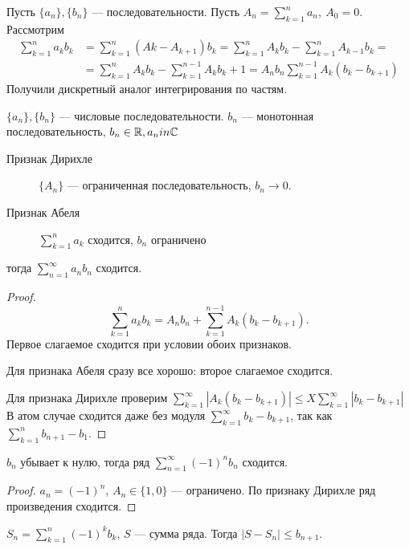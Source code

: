 \begin{lm}
    Пусть $ \{a_n\}, \{b_n\}$ --- последовательности. Пусть $A_n = \sum_{k=1}^{n} a_n , ~ A_0 = 0$.
    Рассмотрим
    \begin{align*}
	\sum_{k=1}^{n}  a_k b_k &= \sum_{k=1}^{n} (Ak - A_{k+1}) b_k = \sum_{k=1}^{n} A_kb_k - \sum_{k=1}^{n} A_{k-1}b_k = \\
				&= \sum_{k=1}^{n} A_k b_k - \sum_{k=1}^{n-1} A_k b_k+1 = A_n b_n  \sum_{k=1}^{n-1} A_k(b_k-b_{k+1})
    \end{align*}
    Получили дискретный аналог интегрирования по частям.
\end{lm}
\begin{thm}
    $ \{a_n\}, \{b_n\}$ --- числовые последовательности.  $ b_n$ --- монотонная последовательность, $ b_n \in \mathbb{R}, a_n in \mathbb{C}$

\begin{description}
    \item[Признак Дирихле] $ \{A_n\} $ --- ограниченная последовательность, $ b_n \to  0$.
    \item[Признак Абеля] $ \sum_{k=1}^{n} a_k $ сходится, $ b_n $ ограничено
\end{description}
тогда $ \sum_{n=1}^{\infty} a_nb_n$ сходится.
\end{thm}
\begin{proof}
     \[
	 \sum_{k=1}^{n} a_k b_k = A_n b_n + \sum_{k=1}^{n-1} A_k (b_k - b_{k+1})
     .\] 
     Первое слагаемое сходится при условии обоих признаков. 

     Для признака Абеля сразу все хорошо: второе слагаемое сходится.

     Для признака Дирихле проверим $ \sum_{k=1}^{\infty}  \left| A_k(b_k - b_{k+1}) \right| \le X \sum_{k=1}^{\infty} | b_k - b_{k+1} | $
     В атом случае сходится даже без модуля $ \sum_{k=1}^{\infty} b_k - b_{k+1} $, так как $ \sum_{k=1}^{n}  b_{n+1} - b_1$.
\end{proof}
\begin{thm} $ b_n$ убывает к нулю, тогда ряд $ \sum_{n=1}^{\infty} (-1)^{n} b_n$ сходится.
\end{thm}
\begin{proof}
    $ a_n = (-1)^{n}$, $ A_n \in  \{1, 0\}$ --- ограничено. По признаку Дирихле ряд произведения сходится.
\end{proof}
\begin{note}
    $ S_n = \sum_{k=1}^{n} (-1)^{k}b_k$, $ S$ --- сумма ряда. Тогда $ \lvert S- S_n \rvert  \le b_{n+1}$. 
\end{note}
